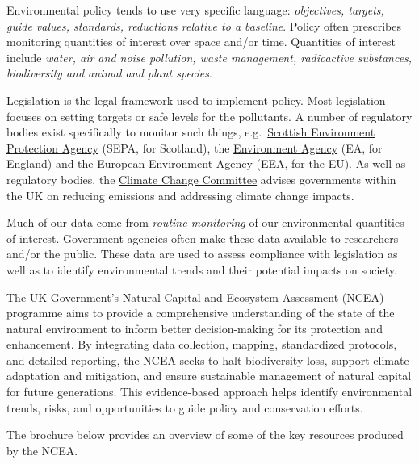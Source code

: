 \documentclass[
  letterpaper,
  DIV=11,
  numbers=noendperiod]{scrartcl}
\begin{document}
Environmental policy tends to use very specific language:
\emph{objectives, targets, guide values, standards, reductions relative
to a baseline}. Policy often prescribes monitoring quantities of
interest over space and/or time. Quantities of interest include
\emph{water, air and noise pollution, waste management, radioactive
substances, biodiversity and animal and plant species}.

Legislation is the legal framework used to implement policy. Most
legislation focuses on setting targets or safe levels for the
pollutants. A number of regulatory bodies exist specifically to monitor
such things,
e.g.~\href{https://beta.sepa.scot/about-sepa/who-we-are/}{Scottish
Environment Protection Agency} (SEPA, for Scotland), the
\href{https://www.gov.uk/government/organisations/environment-agency/about}{Environment
Agency} (EA, for England) and the
\href{https://www.eea.europa.eu/en}{European Environment Agency} (EEA,
for the EU). As well as regulatory bodies, the
\href{https://www.theccc.org.uk/about/}{Climate Change Committee}
advises governments within the UK on reducing emissions and addressing
climate change impacts.

Much of our data come from \emph{routine monitoring} of our
environmental quantities of interest. Government agencies often make
these data available to researchers and/or the public. These data are
used to assess compliance with legislation as well as to identify
environmental trends and their potential impacts on society.

\begin{tcolorbox}[enhanced jigsaw, left=2mm, toprule=.15mm, rightrule=.15mm, coltitle=black, arc=.35mm, colframe=quarto-callout-note-color-frame, breakable, bottomtitle=1mm, colback=white, titlerule=0mm, toptitle=1mm, title={Example of Natural Capital and Ecosystem Assessment (NCEA) programme}, bottomrule=.15mm, colbacktitle=quarto-callout-note-color!10!white, opacitybacktitle=0.6, opacityback=0, leftrule=.75mm]

The UK Government's Natural Capital and Ecosystem Assessment (NCEA)
programme aims to provide a comprehensive understanding of the state of
the natural environment to inform better decision-making for its
protection and enhancement. By integrating data collection, mapping,
standardized protocols, and detailed reporting, the NCEA seeks to halt
biodiversity loss, support climate adaptation and mitigation, and ensure
sustainable management of natural capital for future generations. This
evidence-based approach helps identify environmental trends, risks, and
opportunities to guide policy and conservation efforts.

The brochure below provides an overview of some of the key resources
produced by the NCEA.

\end{tcolorbox}
\end{document}

